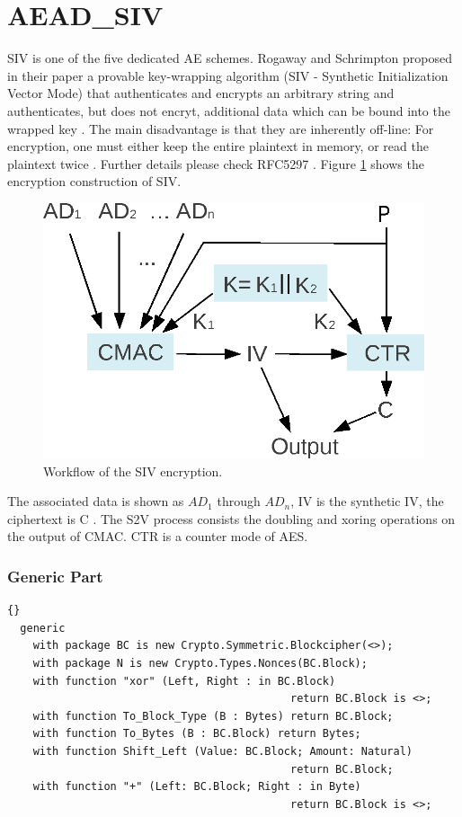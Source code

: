 \section{AEAD\_SIV}
SIV is one of the five dedicated AE schemes. Rogaway and Schrimpton
proposed in their paper a provable key-wrapping algorithm (SIV -
Synthetic Initialization Vector Mode) that authenticates and encrypts
an arbitrary string and authenticates, but does not encryt, additional
data which can be bound into the wrapped key \cite{SIV}. The main
disadvantage is that they are inherently off-line: For encryption, one
must either keep the entire plaintext in memory, or read the plaintext
twice \cite{DBLP:conf/fse/FleischmannFL12}. Further details please
check RFC5297 \cite{SIV}. Figure \ref{SIVEN} shows the encryption
construction of SIV.
\begin{figure}[h]
\centering
\includegraphics[scale=0.7]{./images/SIV_Encryption}
\caption{Workflow of the SIV encryption.}\label{SIVEN}
\end{figure}
The associated data is shown as $AD_1$ through $AD_n$, IV is the
synthetic IV, the ciphertext is C \cite{SIV}. The S2V process consists
the doubling and xoring operations on the output of CMAC. CTR is a
counter mode of AES.

\subsubsection*{Generic Part}
\begin{lstlisting}{}
  generic
    with package BC is new Crypto.Symmetric.Blockcipher(<>);
    with package N is new Crypto.Types.Nonces(BC.Block);
    with function "xor" (Left, Right : in BC.Block)
    										return BC.Block is <>;
    with function To_Block_Type (B : Bytes) return BC.Block;
    with function To_Bytes (B : BC.Block) return Bytes;
    with function Shift_Left (Value: BC.Block; Amount: Natural)
    										return BC.Block;
    with function "+" (Left: BC.Block; Right : in Byte)
    										return BC.Block is <>;
\end{lstlisting}

